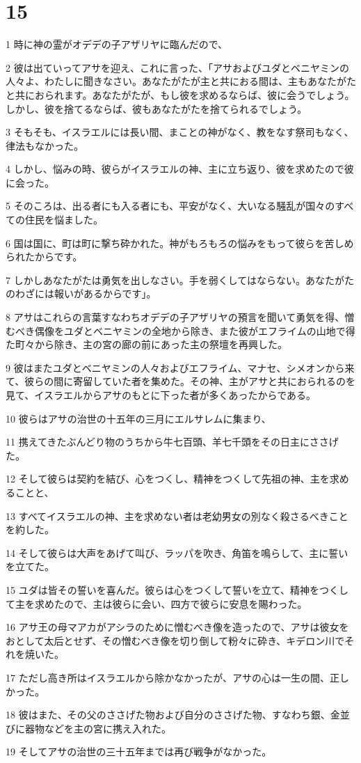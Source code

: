 \chapter{15}

\par 1 時に神の霊がオデデの子アザリヤに臨んだので、
\par 2 彼は出ていってアサを迎え、これに言った、「アサおよびユダとベニヤミンの人々よ、わたしに聞きなさい。あなたがたが主と共におる間は、主もあなたがたと共におられます。あなたがたが、もし彼を求めるならば、彼に会うでしょう。しかし、彼を捨てるならば、彼もあなたがたを捨てられるでしょう。
\par 3 そもそも、イスラエルには長い間、まことの神がなく、教をなす祭司もなく、律法もなかった。
\par 4 しかし、悩みの時、彼らがイスラエルの神、主に立ち返り、彼を求めたので彼に会った。
\par 5 そのころは、出る者にも入る者にも、平安がなく、大いなる騒乱が国々のすべての住民を悩ました。
\par 6 国は国に、町は町に撃ち砕かれた。神がもろもろの悩みをもって彼らを苦しめられたからです。
\par 7 しかしあなたがたは勇気を出しなさい。手を弱くしてはならない。あなたがたのわざには報いがあるからです」。
\par 8 アサはこれらの言葉すなわちオデデの子アザリヤの預言を聞いて勇気を得、憎むべき偶像をユダとベニヤミンの全地から除き、また彼がエフライムの山地で得た町々から除き、主の宮の廊の前にあった主の祭壇を再興した。
\par 9 彼はまたユダとベニヤミンの人々およびエフライム、マナセ、シメオンから来て、彼らの間に寄留していた者を集めた。その神、主がアサと共におられるのを見て、イスラエルからアサのもとに下った者が多くあったからである。
\par 10 彼らはアサの治世の十五年の三月にエルサレムに集まり、
\par 11 携えてきたぶんどり物のうちから牛七百頭、羊七千頭をその日主にささげた。
\par 12 そして彼らは契約を結び、心をつくし、精神をつくして先祖の神、主を求めることと、
\par 13 すべてイスラエルの神、主を求めない者は老幼男女の別なく殺さるべきことを約した。
\par 14 そして彼らは大声をあげて叫び、ラッパを吹き、角笛を鳴らして、主に誓いを立てた。
\par 15 ユダは皆その誓いを喜んだ。彼らは心をつくして誓いを立て、精神をつくして主を求めたので、主は彼らに会い、四方で彼らに安息を賜わった。
\par 16 アサ王の母マアカがアシラのために憎むべき像を造ったので、アサは彼女をおとして太后とせず、その憎むべき像を切り倒して粉々に砕き、キデロン川でそれを焼いた。
\par 17 ただし高き所はイスラエルから除かなかったが、アサの心は一生の間、正しかった。
\par 18 彼はまた、その父のささげた物および自分のささげた物、すなわち銀、金並びに器物などを主の宮に携え入れた。
\par 19 そしてアサの治世の三十五年までは再び戦争がなかった。

